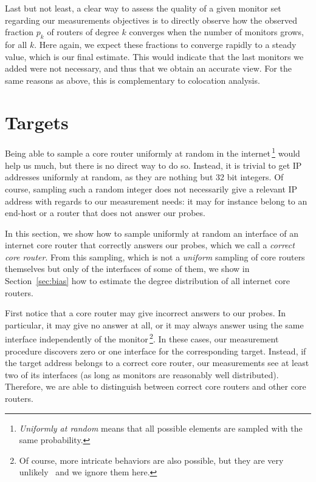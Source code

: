 \documentclass[conference]{IEEEtran}
\begin{document}
Last but not least, a clear way to assess the quality of a given monitor set regarding our measurements objectives is to directly observe how the observed fraction $p_k$ of routers of degree $k$ converges when the number of monitors grows, for all $k$. Here again, we expect these fractions to converge rapidly to a steady value, which is our final estimate. This would indicate that the last monitors we added were not necessary, and thus that we obtain an accurate view. For the same reasons as above, this is complementary to colocation analysis.


\section{Targets} \label{sec:targets}

Being able to sample a core router uniformly at random in the internet\,\footnote{{\em Uniformly at random} means that all possible elements are sampled with the same probability.} would help us much, but there is no direct way to do so. Instead, it is trivial to get IP addresses uniformly at random, as they are nothing but 32 bit integers. Of course, sampling such a random integer does not necessarily give a relevant IP address with regards to our measurement needs: it may for instance belong to an end-host or a router that does not answer our probes.  

In this section, we show how to sample uniformly at random an interface of an internet core router that correctly answers our probes, which we call a {\em correct core router}. From this sampling, which is not a {\em uniform} sampling of core routers themselves but only of the interfaces of some of them, we show in Section~\ref{sec:bias} how to estimate the degree distribution of all internet core routers.

First notice that a core router may give incorrect answers to our probes. In particular, it may give no answer at all, or it may always answer using the same interface independently of the monitor\,\footnote{Of course, more intricate behaviors are also possible, but they are very unlikely~\cite{keys2010internet} and we ignore them here.}. In these cases, our measurement procedure discovers zero or one interface for the corresponding target. Instead, if the target address belongs to a correct core router, our measurements see at least two of its interfaces (as long as monitors are reasonably well distributed). Therefore, we are able to distinguish between correct core routers and other core routers.
\end{document}
